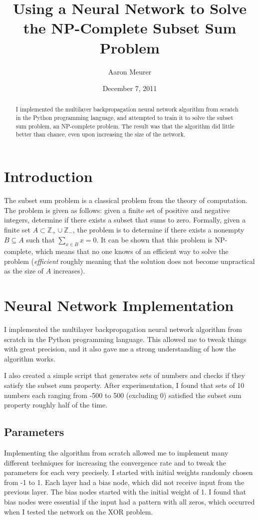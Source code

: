 \documentclass[12pt]{article}
\begin{document}
\title{Using a Neural Network to Solve the NP-Complete Subset Sum Problem}
\author{Aaron Meurer}
\date{December 7, 2011}
\maketitle

\begin{abstract}
I implemented the multilayer backpropagation neural network algorithm from scratch in the Python programming language, and attempted to train it to solve the subset sum problem, an NP-complete problem.  The result was that the algorithm did little better than chance, even upon increasing the size of the network.
\end{abstract}

\section{Introduction}
The subset sum problem is a classical problem from the theory of computation.  The problem is given as follows: given a finite set of positive and negative integers, determine if there exists a subset that sums to zero.  Formally, given a finite set $A\subset \mathbb{Z}_+\cup\mathbb{Z}_-$, the problem is to determine if there exists a nonempty $B\subseteq A$ such that $\sum_{x\in B} x = 0$. It can be shown that this problem is NP-complete, which means that no one knows of an efficient way to solve the problem (\textit{efficient} roughly meaning that the solution does not become unpractical as the size of $A$ increases).

\section{Neural Network Implementation}
I implemented the multilayer backpropagation neural network algorithm from scratch in the Python programming language.  This allowed me to tweak things with great precision, and it also gave me a strong understanding of how the algorithm works.

I also created a simple script that generates sets of numbers and checks if they satisfy the subset sum property.  After experimentation, I found that sets of 10 numbers each ranging from -500 to 500 (excluding 0) satisfied the subset sum property roughly half of the time.

\subsection{Parameters}
Implementing the algorithm from scratch allowed me to implement many different techniques for increasing the convergence rate and to tweak the parameters for each very precisely.  I started with initial weights randomly chosen from -1 to 1.  Each layer had a bias node, which did not receive input from the previous layer.  The bias nodes started with the initial weight of 1. I found that bias nodes were essential if the input had a pattern with all zeros, which occurred when I tested the network on the XOR problem.
\end{document}

